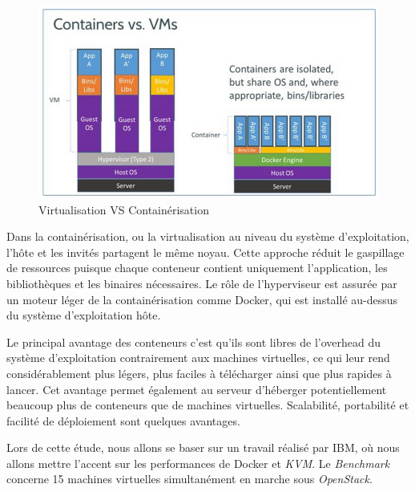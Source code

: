 \begin{onehalfspace}
\begin{figure}[H]
\centering
\includegraphics [scale=0.5]{chapitre2/assets/vm-container.png}
\caption{Virtualisation VS Containérisation}
\end{figure}


Dans la containérisation, ou la virtualisation au niveau du système d'exploitation, l'hôte et les invités partagent le même noyau. Cette approche réduit le gaspillage de ressources puisque chaque conteneur contient uniquement l'application, les bibliothèques et les binaires nécessaires. Le rôle de l'hyperviseur est assurée par un moteur léger de la containérisation comme Docker, qui est installé au-dessus du système d'exploitation hôte.

Le principal avantage des conteneurs c'est qu'ils sont libres de l'overhead du système d'exploitation contrairement aux machines virtuelles, ce qui leur rend considérablement plus légers, plus faciles à télécharger ainsi que plus rapides à lancer. Cet avantage permet également au serveur d'héberger potentiellement beaucoup plus de conteneurs que de machines virtuelles. Scalabilité, portabilité et facilité de déploiement sont quelques avantages.


Lors de cette étude, nous allons se baser sur un travail réalisé par IBM\cite{ibm-benchmark-docker}, où nous allons mettre l'accent sur les performances de Docker et \emph{KVM}. Le \emph{Benchmark} concerne 15 machines virtuelles simultanément en marche sous \emph{OpenStack}.


\def\arraystretch{1.4}%


{
\begin{center}
\begin{table}[H]

	\centering


\end{table}
\end{center}}
\end{onehalfspace}
